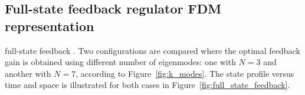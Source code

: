 
\DIFaddend \subsection{Full-state feedback regulator FDM representation}


\DIFdelbegin {}\DIFdelend \DIFaddbegin {}\DIFaddend full-state feedback \DIFdelbegin {}\DIFdelend \DIFaddbegin {}\DIFaddend . Two configurations are compared where the optimal feedback gain is obtained using different number of eigenmodes: one with $N=3$ and another with $N=7$, according to Figure~\ref{fig:k_modes}. The state profile versus time and space is illustrated for both cases in Figure~\ref{fig:full_state_feedback}. 

